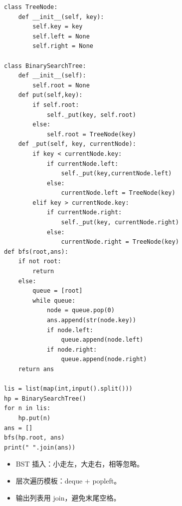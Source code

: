 \documentclass[10pt,a4paper,fontset=none]{ctexart}
\begin{document}
\begin{lstlisting}[style=py,caption={最终可用代码（对话来源）}]
class TreeNode:
    def __init__(self, key):
        self.key = key
        self.left = None
        self.right = None

class BinarySearchTree:
    def __init__(self):
        self.root = None
    def put(self,key):
        if self.root:
            self._put(key, self.root)
        else:
            self.root = TreeNode(key)
    def _put(self, key, currentNode):
        if key < currentNode.key:
            if currentNode.left:
                self._put(key,currentNode.left)
            else:
                currentNode.left = TreeNode(key)
        elif key > currentNode.key:
            if currentNode.right:
                self._put(key, currentNode.right)
            else:
                currentNode.right = TreeNode(key)
def bfs(root,ans):
    if not root:
        return
    else:
        queue = [root]
        while queue:
            node = queue.pop(0)
            ans.append(str(node.key))
            if node.left:
                queue.append(node.left)
            if node.right:
                queue.append(node.right)
    return ans

lis = list(map(int,input().split()))
hp = BinarySearchTree()
for n in lis:
    hp.put(n)
ans = []
bfs(hp.root, ans)
print(" ".join(ans))

\end{lstlisting}
\begin{notebox}
\begin{itemize}
  \item BST 插入：小走左，大走右，相等忽略。
  \item 层次遍历模板：deque + popleft。
  \item 输出列表用 join，避免末尾空格。
\end{itemize}
\end{notebox}
\end{document}
